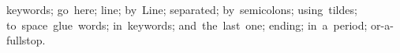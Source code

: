 keywords;
go~here;
line;
by~Line;
separated;
by~semicolons;
using~tildes;
to~space~glue~words;
in~keywords;
and~the~last~one;
ending;
in~a~period;
or-a-fullstop.

